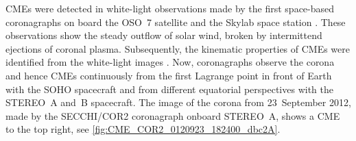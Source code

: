 CMEs were detected in white-light observations made by the first space-based coronagraphs on board the OSO~7 satellite \citep{Tousey1973} and the Skylab space station \citep{MacQueen1974}. These observations show the steady outflow of solar wind, broken by intermittend ejections of coronal plasma. Subsequently, the kinematic properties of CMEs were identified from the white-light images \citep{MacQueen1980}. Now, coronagraphs observe the corona and hence CMEs continuously from the first Lagrange point in front of Earth with the SOHO spacecraft and from different equatorial perspectives with the STEREO~A and~B spacecraft. The image of the corona from 23~September 2012, made by the SECCHI/COR2 coronagraph onboard STEREO~A, shows a CME to the top right, see \autoref{fig:CME_COR2_0120923_182400_dbc2A}.\\
\begin{figure}[htb]
\end{figure}


